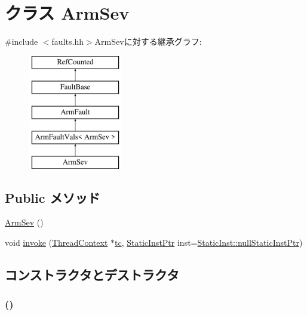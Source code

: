\hypertarget{classArmISA_1_1ArmSev}{
\section{クラス ArmSev}
\label{classArmISA_1_1ArmSev}
}


{\ttfamily \#include $<$faults.hh$>$}ArmSevに対する継承グラフ:\begin{figure}[H]
\begin{center}
\leavevmode
\includegraphics[height=5cm]{classArmISA_1_1ArmSev}
\end{center}
\end{figure}
\subsection*{Public メソッド}
\begin{DoxyCompactItemize}
\item 
\hyperlink{classArmISA_1_1ArmSev_a66acfa8195a707c7d4bb7c9d91e099d8}{ArmSev} ()
\item 
void \hyperlink{classArmISA_1_1ArmSev_a2bd783b42262278d41157d428e1f8d6f}{invoke} (\hyperlink{classThreadContext}{ThreadContext} $\ast$\hyperlink{namespaceArmISA_a5aff829af55e65b802d83dfcef4e9dd0}{tc}, \hyperlink{classRefCountingPtr}{StaticInstPtr} inst=\hyperlink{classStaticInst_aa793d9793af735f09096369fb17567b6}{StaticInst::nullStaticInstPtr})
\end{DoxyCompactItemize}


\subsection{コンストラクタとデストラクタ}
\hypertarget{classArmISA_1_1ArmSev_a66acfa8195a707c7d4bb7c9d91e099d8}{
\subsubsection[{ArmSev}]{ ()}}
\label{classArmISA_1_1ArmSev_a66acfa8195a707c7d4bb7c9d91e099d8}



